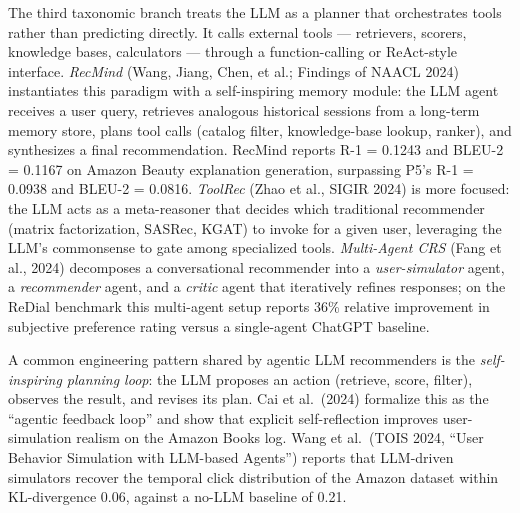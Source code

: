 The third taxonomic branch treats the LLM as a planner that orchestrates tools rather than predicting directly. It calls external tools --- retrievers, scorers, knowledge bases, calculators --- through a function-calling or ReAct-style interface. \emph{RecMind} (Wang, Jiang, Chen, et al.; Findings of NAACL 2024) instantiates this paradigm with a self-inspiring memory module: the LLM agent receives a user query, retrieves analogous historical sessions from a long-term memory store, plans tool calls (catalog filter, knowledge-base lookup, ranker), and synthesizes a final recommendation. RecMind reports R-1 = 0.1243 and BLEU-2 = 0.1167 on Amazon Beauty explanation generation, surpassing P5's R-1 = 0.0938 and BLEU-2 = 0.0816. \emph{ToolRec} (Zhao et al., SIGIR 2024) is more focused: the LLM acts as a meta-reasoner that decides which traditional recommender (matrix factorization, SASRec, KGAT) to invoke for a given user, leveraging the LLM's commonsense to gate among specialized tools. \emph{Multi-Agent CRS} (Fang et al., 2024) decomposes a conversational recommender into a \emph{user-simulator} agent, a \emph{recommender} agent, and a \emph{critic} agent that iteratively refines responses; on the ReDial benchmark this multi-agent setup reports 36\% relative improvement in subjective preference rating versus a single-agent ChatGPT baseline.

A common engineering pattern shared by agentic LLM recommenders is the \emph{self-inspiring planning loop}: the LLM proposes an action (retrieve, score, filter), observes the result, and revises its plan. Cai et al.~(2024) formalize this as the ``agentic feedback loop'' and show that explicit self-reflection improves user-simulation realism on the Amazon Books log. Wang et al.~(TOIS 2024, ``User Behavior Simulation with LLM-based Agents'') reports that LLM-driven simulators recover the temporal click distribution of the Amazon dataset within KL-divergence 0.06, against a no-LLM baseline of 0.21.

